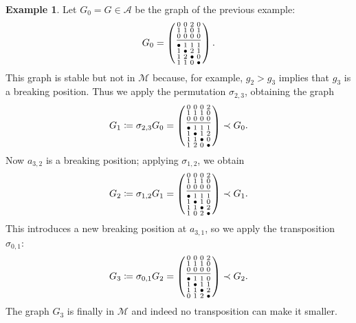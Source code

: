 \documentclass{amsart}
\theoremstyle{plain}
\theoremstyle{definition}
\newtheorem{example}[theorem]{Example}
\newcommand{\psm}[1]{\left(\begin{smallmatrix}#1\end{smallmatrix}\right)}
\begin{document}
\begin{example}
  Let $G_0 = G \in \mathcal{A}$ be the graph of the previous example:
  \[
  G_0 = \psm{
    0 & 0 & 2 & 0\\
    1 & 1 & 0 & 1\\
    0 & 0 & 0 & 0\\[2pt]
    \hline\\[1pt]
    \bullet & 1 & 1 & 1\\
    1 &\bullet & 2 & 1\\
    1 & 2 & \bullet & 0\\
    1 & 1 & 0 & \bullet
  }\text{.}
  \]
  This graph is stable but not in $\mathcal{M}$ because, for example,
  $g_2 > g_3$ implies that $g_3$ is a breaking position. Thus we apply
  the permutation $\sigma_{2,3}$, obtaining the graph
  \[
  G_1 \coloneqq \sigma_{2,3} G_0 = \psm{
    0 & 0 & 0 & 2\\
    1 & 1 & 1 & 0\\
    0 & 0 & 0 & 0\\[2pt]
    \hline\\[1pt]
    \bullet & 1 & 1 & 1\\
    1 & \bullet & 1 & 2\\
    1 & 1 & \bullet & 0\\
    1 & 2 & 0 & \bullet
  } \prec G_0\text{.}
  \]
  Now $a_{3,2}$ is a breaking position; applying $\sigma_{1,2}$, we
  obtain
  \[
  G_2 \coloneqq \sigma_{1,2} G_1 = \psm{
    0 & 0 & 0 & 2\\
    1 & 1 & 1 & 0\\
    0 & 0 & 0 & 0\\[2pt]
    \hline\\[1pt]
    \bullet & 1 & 1 & 1\\
    1 & \bullet & 1 & 0\\
    1 & 1 & \bullet & 2\\
    1 & 0 & 2 & \bullet
  } \prec G_1\text{.}
  \]
  This introduces a new breaking position at $a_{3,1}$, so we apply
  the transposition $\sigma_{0,1}$:
  \[
  G_3 \coloneqq \sigma_{0,1} G_2 = \psm{
    0 & 0 & 0 & 2\\
    1 & 1 & 1 & 0\\
    0 & 0 & 0 & 0\\[2pt]
    \hline\\[1pt]
    \bullet & 1 & 1 & 0\\
    1 & \bullet & 1 & 1\\
    1 & 1 & \bullet & 2\\
    0 & 1 & 2 & \bullet
  } \prec G_2\text{.}
  \]
  The graph $G_3$ is finally in $\mathcal{M}$ and indeed no
  transposition can make it smaller.
\end{example}
\end{document}
